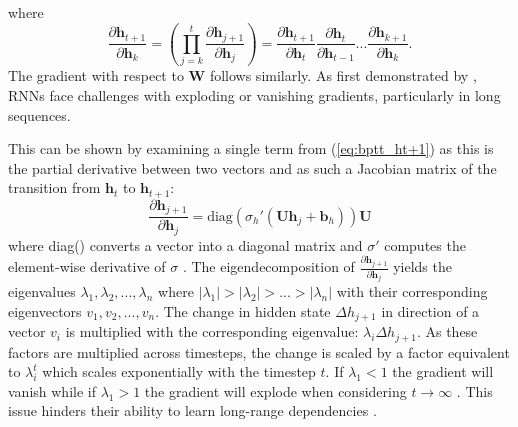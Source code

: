\documentclass[12pt, a4paper, headinclude, twoside, plainheadsepline, open=right, numbers=noenddot, hidelinks, toc=listof, toc=bibliography]{scrreprt}
\begin{document}
where
\begin{equation}
\label{eq:bptt_ht+1}
\frac{\partial \mathbf{h}_{t+1}}{\partial \mathbf{h}_k} 
= 
\left(\prod_{j=k}^{t}\frac{\partial \mathbf{h}_{j+1}}{\partial \mathbf{h}_j}\right)
=
\frac{\partial \mathbf{h}_{t+1}}{\partial \mathbf{h}_t}
\frac{\partial \mathbf{h}_{t}}{\partial \mathbf{h}_{t-1}}
 . . . 
\frac{\partial \mathbf{h}_{k+1}}{\partial \mathbf{h}_k}.
\end{equation}
The gradient with respect to $\mathbf{W}$ follows similarly.
As first demonstrated by \citeauthor{bengioLearningLongtermDependencies1994} \cite{bengioLearningLongtermDependencies1994}, RNNs face challenges with exploding or vanishing gradients, particularly in long sequences.

This can be shown by examining a single term from (\ref{eq:bptt_ht+1}) as this is the partial derivative between two vectors and as such a Jacobian matrix of the transition from $\mathbf{h}_t$ to $\mathbf{h}_{t+1}$:
\begin{equation}
\label{eq:bptt_jacobian}
\frac{\partial \mathbf{h}_{j+1}}{\partial \mathbf{h}_j}
= 
\text{diag}(\sigma_{h}' ( \mathbf{U} \mathbf{h}_j + \mathbf{b}_h)) \mathbf{U}
\end{equation}
where diag() converts a vector into a diagonal matrix and $\sigma '$ computes the element-wise derivative of $\sigma$
\cite{pascanuDifficultyTrainingRecurrent2013}.
The eigendecomposition of $\frac{\partial \mathbf{h}_{j+1}}{\partial \mathbf{h}_j}$ yields the eigenvalues $ \lambda_1, \lambda_2, ..., \lambda_n$ where $|\lambda_1| > |\lambda_2| > ... > |\lambda_n|$ with their corresponding eigenvectors $v_1, v_2, ..., v_n$.
The change in hidden state $\Delta h_{j+1}$ in direction of a vector $v_i$ is multiplied with the corresponding eigenvalue: $\lambda_i \Delta h_{j+1}$.
As these factors are multiplied across timesteps, the change is scaled by a factor equivalent to $\lambda_i^t$ which scales exponentially with the timestep $t$.
If $\lambda_1 < 1$ the gradient will vanish while if $\lambda_1 > 1$ the gradient will explode when considering $t \to \infty$ \cite{pascanuDifficultyTrainingRecurrent2013}.
This issue hinders their ability to learn long-range dependencies \cite{sutskeverTrainingRecurrentNeural2013}. 
\end{document}
